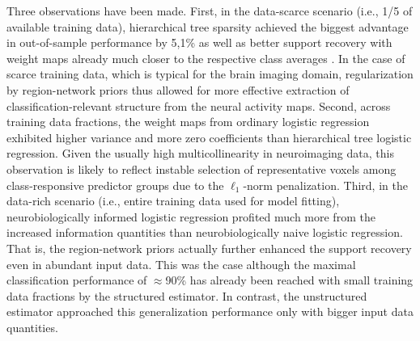 \documentclass{article}
\begin{document}
Three observations have been made.
First,
in the data-scarce scenario (i.e., 1/5 of available training data),
hierarchical tree sparsity achieved the biggest advantage
in out-of-sample performance by 5,1\% as well as
better support recovery with weight maps already much closer
to the respective class averages
\cite{varoquaux2012small}.
In the case of scarce training data, which is typical for the brain imaging domain,
regularization by region-network priors thus allowed for
more effective extraction of classification-relevant structure
from the neural activity maps.
%
Second,
across training data fractions,
the weight maps from ordinary logistic regression exhibited
higher variance and more zero coefficients
than hierarchical tree logistic regression.
Given the usually high multicollinearity in neuroimaging data,
this observation is likely to reflect instable selection of
representative voxels among class-responsive predictor groups
due to the $\ell_1$-norm penalization.
%
Third,
in the data-rich scenario (i.e., entire training data used for model fitting),
neurobiologically informed logistic regression
profited much more from the increased information quantities than
neurobiologically naive logistic regression.
That is, the region-network priors actually further enhanced the support
recovery even in abundant input data.
This was the case although
the maximal classification performance of $\approx$90\% has already
been reached with small training data fractions by the structured estimator.
In contrast, 
the unstructured estimator approached this generalization performance
only with bigger input data quantities.
%
\end{document}
